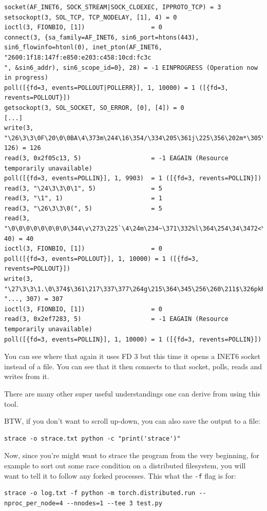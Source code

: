 \documentclass[
]{report}
\begin{document}
\begin{verbatim}
socket(AF_INET6, SOCK_STREAM|SOCK_CLOEXEC, IPPROTO_TCP) = 3
setsockopt(3, SOL_TCP, TCP_NODELAY, [1], 4) = 0
ioctl(3, FIONBIO, [1])                  = 0
connect(3, {sa_family=AF_INET6, sin6_port=htons(443), sin6_flowinfo=htonl(0), inet_pton(AF_INET6, "2600:1f18:147f:e850:e203:c458:10cd:fc3c
", &sin6_addr), sin6_scope_id=0}, 28) = -1 EINPROGRESS (Operation now in progress)
poll([{fd=3, events=POLLOUT|POLLERR}], 1, 10000) = 1 ([{fd=3, revents=POLLOUT}])
getsockopt(3, SOL_SOCKET, SO_ERROR, [0], [4]) = 0
[...]
write(3, "\26\3\3\0F\20\0\0BA\4\373m\244\16\354/\334\205\361j\225\356\202m*\305\332\275\251\17J"..., 126) = 126
read(3, 0x2f05c13, 5)                   = -1 EAGAIN (Resource temporarily unavailable)
poll([{fd=3, events=POLLIN}], 1, 9903)  = 1 ([{fd=3, revents=POLLIN}])
read(3, "\24\3\3\0\1", 5)               = 5
read(3, "\1", 1)                        = 1
read(3, "\26\3\3\0(", 5)                = 5
read(3, "\0\0\0\0\0\0\0\0\344\v\273\225`\4\24m\234~\371\332%l\364\254\34\3472<\0356s\313"..., 40) = 40
ioctl(3, FIONBIO, [1])                  = 0
poll([{fd=3, events=POLLOUT}], 1, 10000) = 1 ([{fd=3, revents=POLLOUT}])
write(3, "\27\3\3\1.\0\374$\361\217\337\377\264g\215\364\345\256\260\211$\326pkR\345\276,\321\221`-"..., 307) = 307
ioctl(3, FIONBIO, [1])                  = 0
read(3, 0x2ef7283, 5)                   = -1 EAGAIN (Resource temporarily unavailable)
poll([{fd=3, events=POLLIN}], 1, 10000) = 1 ([{fd=3, revents=POLLIN}])
\end{verbatim}

You can see where that again it uses FD 3 but this time it opens a INET6
socket instead of a file. You can see that it then connects to that
socket, polls, reads and writes from it.

There are many other super useful understandings one can derive from
using this tool.

BTW, if you don't want to scroll up-down, you can also save the output
to a file:

\begin{verbatim}
strace -o strace.txt python -c "print('strace')"
\end{verbatim}

Now, since you're might want to strace the program from the very
beginning, for example to sort out some race condition on a distributed
filesystem, you will want to tell it to follow any forked processes.
This what the \texttt{-f} flag is for:

\begin{verbatim}
strace -o log.txt -f python -m torch.distributed.run --nproc_per_node=4 --nnodes=1 --tee 3 test.py
\end{verbatim}
\end{document}
